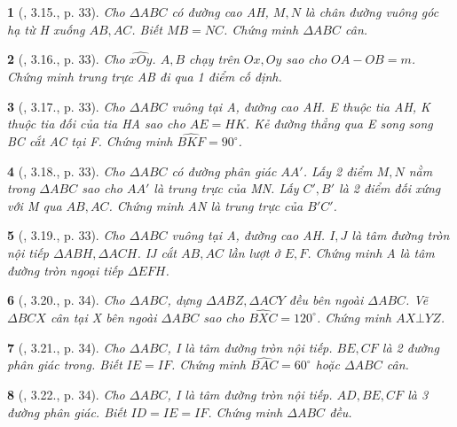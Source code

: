\documentclass{article}
\newtheorem{baitoan}{}
\begin{document}
\begin{baitoan}[\cite{Hung_Mai_Toan_7_hinh_hoc}, 3.15., p. 33]
	Cho $\Delta ABC$ có đường cao AH, $M,N$ là chân đường vuông góc hạ từ H xuống $AB,AC$. Biết $MB = NC$. Chứng minh $\Delta ABC$ cân.
\end{baitoan}

\begin{baitoan}[\cite{Hung_Mai_Toan_7_hinh_hoc}, 3.16., p. 33]
	Cho $\widehat{xOy}$. $A,B$ chạy trên $Ox,Oy$ sao cho $OA - OB = m$. Chứng minh trung trực AB đi qua 1 điểm cố định.
\end{baitoan}

\begin{baitoan}[\cite{Hung_Mai_Toan_7_hinh_hoc}, 3.17., p. 33]
	Cho $\Delta ABC$ vuông tại A, đường cao AH. E thuộc tia AH, K thuộc tia đối của tia HA sao cho $AE = HK$. Kẻ đường thẳng qua E song song BC cắt AC tại F. Chứng minh $\widehat{BKF} = 90^\circ$.
\end{baitoan}

\begin{baitoan}[\cite{Hung_Mai_Toan_7_hinh_hoc}, 3.18., p. 33]
	Cho $\Delta ABC$ có đường phân giác $AA'$. Lấy 2 điểm $M,N$ nằm trong $\Delta ABC$ sao cho $AA'$ là trung trực của MN. Lấy $C',B'$ là 2 điểm đối xứng với M qua $AB,AC$. Chứng minh AN là trung trực của $B'C'$.
\end{baitoan}

\begin{baitoan}[\cite{Hung_Mai_Toan_7_hinh_hoc}, 3.19., p. 33]
	Cho $\Delta ABC$ vuông tại A, đường cao AH.  $I,J$ là tâm đường tròn nội tiếp $\Delta ABH,\Delta ACH$. IJ cắt $AB,AC$ lần lượt ở $E,F$. Chứng minh A là tâm đường tròn ngoại tiếp $\Delta EFH$.
\end{baitoan}

\begin{baitoan}[\cite{Hung_Mai_Toan_7_hinh_hoc}, 3.20., p. 34]
	Cho $\Delta ABC$, dựng $\Delta ABZ,\Delta ACY$ đều bên ngoài $\Delta ABC$. Vẽ $\Delta BCX$ cân tại X bên ngoài $\Delta ABC$ sao cho $\widehat{BXC} = 120^\circ$. Chứng minh $AX\bot YZ$.
\end{baitoan}

\begin{baitoan}[\cite{Hung_Mai_Toan_7_hinh_hoc}, 3.21., p. 34]
	Cho $\Delta ABC$, I là tâm đường tròn nội tiếp. $BE,CF$ là 2 đường phân giác trong. Biết $IE = IF$. Chứng minh $\widehat{BAC} = 60^\circ$ hoặc $\Delta ABC$ cân.
\end{baitoan}

\begin{baitoan}[\cite{Hung_Mai_Toan_7_hinh_hoc}, 3.22., p. 34]
	Cho $\Delta ABC$, I là tâm đường tròn nội tiếp. $AD,BE,CF$ là 3 đường phân giác. Biết $ID = IE = IF$. Chứng minh $\Delta ABC$ đều.
\end{baitoan}
\end{document}
